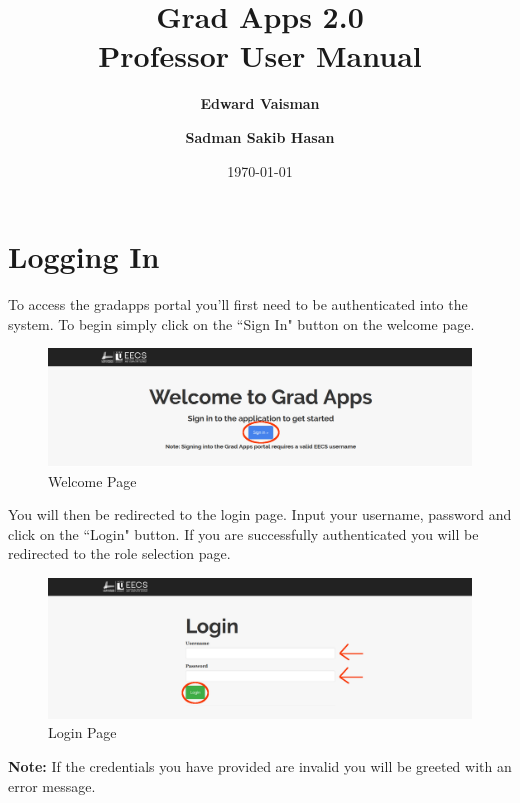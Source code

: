 \documentclass[fontsize=12pt,paper=letter,twoside]{scrartcl}
\author{\textbf{Edward Vaisman}
\and \textbf{Sadman Sakib Hasan}
}
\date{\today} %
\begin{document}
\title{Grad Apps 2.0 \\ Professor User Manual}
\maketitle

\newpage

\tableofcontents

\newpage



\clearpage
\section{Logging In}

To access the gradapps portal you'll first need to be authenticated into the system. To begin simply click on the ``Sign In" button on the welcome page.

\begin{figure}[!htb]
\begin{center}
\includegraphics[width=.99\textwidth]{images/welcome.png}
\end{center}
\caption{Welcome Page}
\label{fig:welcome}
\end{figure}

\bigskip

You will then be redirected to the login page. Input your username, password and click on the ``Login" button. If you are successfully authenticated you will be redirected to the role selection page.

\begin{figure}[!htb]
\begin{center}
\includegraphics[width=.99\textwidth]{images/login.png}
\end{center}
\caption{Login Page}
\label{fig:login}
\end{figure}
\noindent \textbf{Note:} If the credentials you have provided are invalid you will be greeted with an error message.
\end{document}
